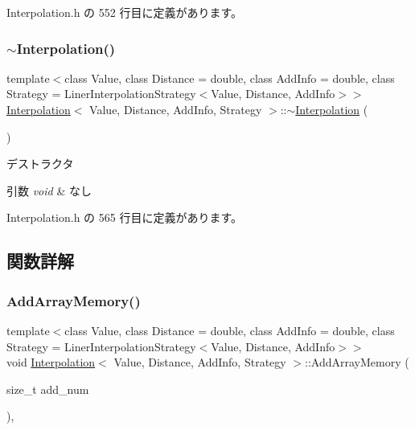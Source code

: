  Interpolation.\+h の 552 行目に定義があります。

\mbox{\label{class_interpolation_a71961e7c2738236a592b73d59cf0efd6}} 
\subsubsection{\texorpdfstring{$\sim$\+Interpolation()}{~Interpolation()}}
{\footnotesize\ttfamily template$<$class Value, class Distance = double, class Add\+Info = double, class Strategy = Liner\+Interpolation\+Strategy$<$\+Value, Distance, Add\+Info$>$$>$ \\
\mbox{\hyperlink{class_interpolation}{Interpolation}}$<$ Value, Distance, Add\+Info, Strategy $>$\+::$\sim$\mbox{\hyperlink{class_interpolation}{Interpolation}} (\begin{DoxyParamCaption}{ }\end{DoxyParamCaption})\hspace{0.3cm}{\ttfamily [inline]}}



デストラクタ 


\begin{DoxyParams}{引数}
{\em void} & なし \\
\hline
\end{DoxyParams}


 Interpolation.\+h の 565 行目に定義があります。



\subsection{関数詳解}
\mbox{\label{class_interpolation_a1dc67b8338621f7504256d90e3980d0c}} 
\subsubsection{\texorpdfstring{Add\+Array\+Memory()}{AddArrayMemory()}}
{\footnotesize\ttfamily template$<$class Value, class Distance = double, class Add\+Info = double, class Strategy = Liner\+Interpolation\+Strategy$<$\+Value, Distance, Add\+Info$>$$>$ \\
void \mbox{\hyperlink{class_interpolation}{Interpolation}}$<$ Value, Distance, Add\+Info, Strategy $>$\+::Add\+Array\+Memory (\begin{DoxyParamCaption}\item[{size\+\_\+t}]{add\+\_\+num }\end{DoxyParamCaption})\hspace{0.3cm}{\ttfamily [inline]}, {\ttfamily [private]}}



